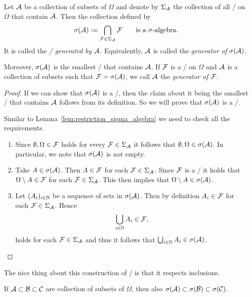 \begin{proposition}\label{prop:generated_sigalg}
Let $\mathcal A$ be a collection of subsets of $\Omega$ and denote by $\Sigma_{\mathcal A}$ the collection of all \sigalgs/ on $\Omega$ that contain $\mathcal A$. Then the collection defined by
\[
	\sigma(\cA) := \bigcap_{\cF \in \Sigma_\cA} \cF\qquad\text{is a \sigalg/.}
\]
It is called the \emph{\sigalg/ generated by $\mathcal A$}. Equivalently, $\mathcal A$ is called the \emph{generator of $\sigma(\mathcal A)$}.

Moreover, $\sigma(\mathcal A)$ is the smallest \sigalg/ that contains $\mathcal A$. If $\mathcal F$ is a \sigalg/ on $\Omega$ and $\mathcal A$ is a collection of subsets such that $\mathcal F = \sigma(\mathcal A)$, we call $\mathcal A$ the \emph{generator of $\mathcal F$}. 
\end{proposition}

\begin{proof}
If we can show that $\sigma(\mathcal A)$ is a \sigalg/, then the claim about it being the smallest \sigalg/ that contains $\mathcal A$ follows from its definition. So we will prove that $\sigma(\mathcal A)$ is a \sigalg/.

Similar to Lemma~\ref{lem:restriction_sigma_algebra} we need to check all the requirements.
\begin{enumerate}
\item Since $\emptyset, \Omega \in \mathcal F$ holds for every $\mathcal F \in \Sigma_{\mathcal A}$ it follows that $\emptyset, \Omega \in \sigma(\mathcal A)$. In particular, we note that $\sigma(\mathcal A)$ is not empty.
\item Take $A \in \sigma(\mathcal A)$. Then $A \in \mathcal F$ for each $\mathcal F \in \Sigma_{\mathcal A}$. Since $\mathcal F$ is a \sigalg/ it holds that $\Omega \setminus A \in \mathcal F$ for each $\mathcal F \in \Sigma_{\mathcal A}$. This then implies that $\Omega \setminus A \in \sigma(\mathcal A)$.
\item Let $(A_i)_{i \in \mathbb N}$ be a sequence of sets in $\sigma(\mathcal A)$. Then by definition $A_i \in \mathcal F$ for each $\mathcal F \in \Sigma_{\mathcal A}$. Hence
\[
	\bigcup_{i \in \mathbb N} A_i \in \mathcal F,
\] 
holds for each $\mathcal F \in \Sigma_{\mathcal A}$ and thus it follows that $\bigcup_{i \in \mathbb N} A_i \in \sigma(\mathcal A)$.\qedhere
\end{enumerate}
\end{proof}

The nice thing about this construction of \sigalgs/ is that it respects inclusions.

\begin{lemma}\label{lem:inclusion_sigalgs}
If $\mathcal A \subset \mathcal B \subset \mathcal C$ are collection of subsets of $\Omega$, then also $\sigma(\mathcal A) \subset \sigma(\mathcal B) \subset \sigma(\mathcal C)$.
\end{lemma}

